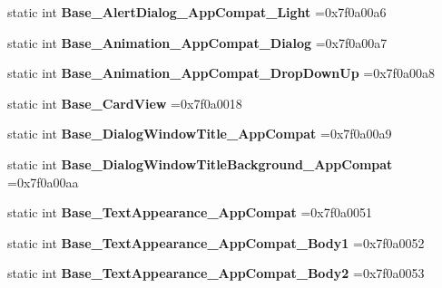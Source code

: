 \begin{DoxyCompactItemize}
static int {\bfseries Base\+\_\+\+Alert\+Dialog\+\_\+\+App\+Compat\+\_\+\+Light} =0x7f0a00a6
\item 
\mbox{\label{classandroid_1_1support_1_1v4_1_1R_1_1style_a017ed0a71c241c74d3de4dad9629aaca}} 
static int {\bfseries Base\+\_\+\+Animation\+\_\+\+App\+Compat\+\_\+\+Dialog} =0x7f0a00a7
\item 
\mbox{\label{classandroid_1_1support_1_1v4_1_1R_1_1style_ab88c3ee1a54a73ef16d7c1db8b8c6384}} 
static int {\bfseries Base\+\_\+\+Animation\+\_\+\+App\+Compat\+\_\+\+Drop\+Down\+Up} =0x7f0a00a8
\item 
\mbox{\label{classandroid_1_1support_1_1v4_1_1R_1_1style_a547532081de4d6ee4f1e02d05ae37e84}} 
static int {\bfseries Base\+\_\+\+Card\+View} =0x7f0a0018
\item 
\mbox{\label{classandroid_1_1support_1_1v4_1_1R_1_1style_a3605ded4e2c7bc7f0d87d8bd22de644a}} 
static int {\bfseries Base\+\_\+\+Dialog\+Window\+Title\+\_\+\+App\+Compat} =0x7f0a00a9
\item 
\mbox{\label{classandroid_1_1support_1_1v4_1_1R_1_1style_aabdc2eb2d04ba8b518e7cb20c16933c7}} 
static int {\bfseries Base\+\_\+\+Dialog\+Window\+Title\+Background\+\_\+\+App\+Compat} =0x7f0a00aa
\item 
\mbox{\label{classandroid_1_1support_1_1v4_1_1R_1_1style_ad468e322c19b6a00be20beb1af0429e2}} 
static int {\bfseries Base\+\_\+\+Text\+Appearance\+\_\+\+App\+Compat} =0x7f0a0051
\item 
\mbox{\label{classandroid_1_1support_1_1v4_1_1R_1_1style_a28fe174ca7ecea4b694a033ebda0bdb3}} 
static int {\bfseries Base\+\_\+\+Text\+Appearance\+\_\+\+App\+Compat\+\_\+\+Body1} =0x7f0a0052
\item 
\mbox{\label{classandroid_1_1support_1_1v4_1_1R_1_1style_ae51db0660928f74b8a99b66f05ee564b}} 
static int {\bfseries Base\+\_\+\+Text\+Appearance\+\_\+\+App\+Compat\+\_\+\+Body2} =0x7f0a0053

\end{DoxyCompactItemize}
